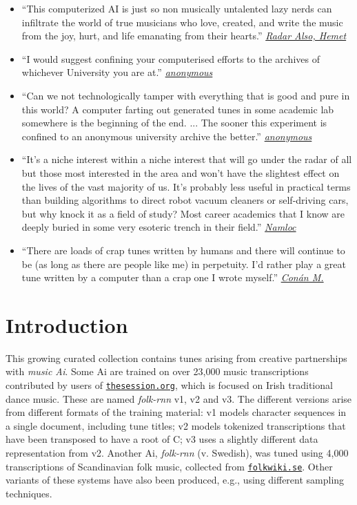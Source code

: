 \documentclass[a4paper,notitlepage,twoside]{book}
\begin{document}
\begin{itemize}
\item ``This computerized AI is just so non musically untalented lazy nerds can infiltrate the world of true musicians who love, created, and write the music from the joy, hurt, and life emanating from their hearts.'' \href{https://www.dailymail.co.uk/sciencetech/article-4544400/Researchers-create-computer-writes-folk-music.html#comments}{{\em Radar Also, Hemet}}
\item ``I would suggest confining your computerised efforts to the archives of whichever University you are at.'' \href{https://thesession.org/discussions/39604}{{\em anonymous}}
\item ``Can we not technologically tamper with everything that is good and pure in this world? A computer farting out generated tunes in some academic lab somewhere is the beginning of the end. ... The sooner this experiment is confined to an anonymous university archive the better.'' \href{https://thesession.org/discussions/40416}{{\em anonymous}}
\item ``It’s a niche interest within a niche interest that will go under the radar of all but those most interested in the area and won’t have the slightest effect on the lives of the vast majority of us. It’s probably less useful in practical terms than building algorithms to direct robot vacuum cleaners or self-driving cars, but why knock it as a field of study? Most career academics that I know are deeply buried in some very esoteric trench in their field.'' \href{https://thesession.org/discussions/39604}{{\em Namloc}}
\item ``There are loads of crap tunes written by humans and there will continue to be (as long as there are people like me) in perpetuity. I’d rather play a great tune written by a computer than a crap one I wrote myself.'' \href{https://thesession.org/discussions/39604}{{\em Conán M.}}
\end{itemize}

\tableofcontents
\mainmatter
\chapter{Introduction}
This growing curated collection contains tunes
arising from creative partnerships with {\em music Ai}. %
Some Ai are trained on over 23,000 music transcriptions 
contributed by users of \href{http://thesession.org}{\tt thesession.org},
which is focused on Irish traditional dance music.
These are named {\em folk-rnn} v1, v2 and v3. 
The different versions arise from
different formats of the training material:
v1 models character sequences in a single document, 
including tune titles;
v2 models tokenized transcriptions that have been transposed to 
have a root of C;
v3 uses a slightly different data representation from v2.
Another Ai, {\em folk-rnn} (v. Swedish), was tuned using 4,000 transcriptions of 
Scandinavian folk music, collected from \href{http://folkwiki.se}{\tt folkwiki.se}.
Other variants of these systems have also been produced,
e.g., using different sampling techniques.
\end{document}
